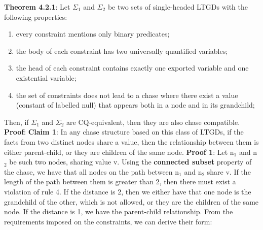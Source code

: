 \documentclass[11pt, a4paper, dvipsnames]{article}
\begin{document}
\textbf{Theorem 4.2.1}: Let $\Sigma_{1}$ and $\Sigma_{2}$ be two sets of single-headed LTGDs with the following properties:
\begin{enumerate}
	\item every constraint mentions only binary predicates;
	\item the body of each constraint has two universally quantified variables;
	\item the head of each constraint contains exactly one exported variable and one existential variable;
	\item the set of constraints does not lead to a chase where there exist a value (constant of labelled null) that appears both in a node and in its grandchild;
\end{enumerate}
Then, if $\Sigma_{1}$ and $\Sigma_{2}$ are CQ-equivalent, then they are also chase compatible.\newline
\textbf{Proof}: \newline
\textbf{Claim 1}: In any chase structure based on this class of LTGDs, if the facts from two distinct nodes share a value, then the relationship between them is either parent-child, or they are children of the same node.\newline
\textbf{Proof 1}: Let n$_{1}$ and n$_{2}$ be such two nodes, sharing value v. Using the \textbf{connected subset} property of the chase, we have that all nodes on the path between n$_{1}$ and n$_{2}$ share v. If the length of the path between them is greater than 2, then there must exist a violation of rule 4. If the distance is 2, then we either have that one node is the grandchild of the other, which is not allowed, or they are the children of the same node. If the distance is 1, we have the parent-child relationship.\newline
From the requirements imposed on the constraints, we can derive their form:
\end{document}
